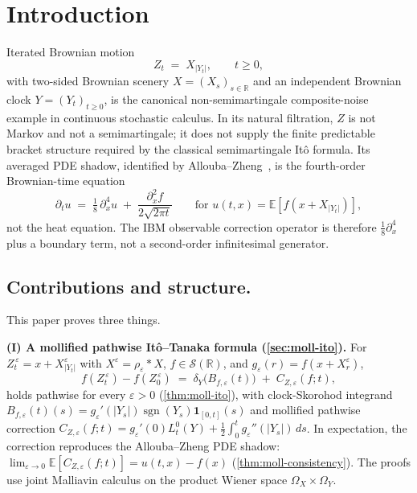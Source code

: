 \documentclass[EJP]{ejpecp}
\newcommand{\R}{\mathbb{R}}
\renewcommand{\E}{\mathbb{E}}
\newcommand{\IBM}{Z}
\DeclareMathOperator{\sgn}{sgn}
\begin{document}
\section{Introduction}\label{sec:intro}

Iterated Brownian motion
\begin{equation}\label{eq:ibm-def}
  \IBM_t\;=\;X_{|Y_t|},\qquad t\ge 0,
\end{equation}
with two-sided Brownian scenery $X=(X_s)_{s\in\R}$ and an independent
Brownian clock $Y=(Y_t)_{t\ge 0}$, is the canonical non-semimartingale
composite-noise example in continuous stochastic calculus. In its
natural filtration, $\IBM$ is not Markov and not a semimartingale;
it does not supply the finite predictable bracket structure required
by the classical semimartingale It\^o formula. Its averaged PDE
shadow, identified by Allouba--Zheng~\cite{AllouZheng}, is the
fourth-order Brownian-time equation
\begin{equation}\label{eq:az-intro}
  \partial_t u\;=\;\tfrac18\,\partial_x^{4}u
   \;+\;\frac{\partial_x^{2}f}{2\sqrt{2\pi t}}
  \qquad\text{for }u(t,x)=\E[f(x+X_{|Y_t|})],
\end{equation}
not the heat equation. The IBM observable correction operator is
therefore $\tfrac18\partial_x^{4}$ plus a boundary term, not a
second-order infinitesimal generator.

\subsection*{Contributions and structure.}
This paper proves three things.

\smallskip
\noindent\textbf{(I) A mollified pathwise It\^o--Tanaka formula
(\cref{sec:moll-ito}).}
For $\IBM_t^{\,\varepsilon}=x+X^{\varepsilon}_{|Y_t|}$ with
$X^{\varepsilon}=\rho_{\varepsilon}*X$, $f\in\mathscr S(\R)$, and
$g_{\varepsilon}(r)=f(x+X^{\varepsilon}_{r})$,
\begin{equation}\label{eq:flagship-intro}
  f(\IBM_t^{\,\varepsilon})-f(\IBM_0^{\,\varepsilon})
   \;=\;\delta_Y\bigl(B_{f,\varepsilon}(t)\bigr)
   \;+\;C_{\IBM,\varepsilon}(f;t),
\end{equation}
holds pathwise for every $\varepsilon>0$ (\cref{thm:moll-ito}), with
clock-Skorohod integrand
$B_{f,\varepsilon}(t)(s)=g_\varepsilon'(|Y_s|)\sgn(Y_s)\mathbf 1_{[0,t]}(s)$
and mollified pathwise correction
$C_{\IBM,\varepsilon}(f;t)=g_\varepsilon'(0)L_t^{0}(Y)
+\tfrac12\!\int_0^{t}g_\varepsilon''(|Y_s|)\,ds$.
In expectation, the correction reproduces the Allouba--Zheng PDE
shadow: $\lim_{\varepsilon\to 0}\E[C_{\IBM,\varepsilon}(f;t)]
=u(t,x)-f(x)$ (\cref{thm:moll-consistency}). The proofs use joint
Malliavin calculus on the product Wiener space
$\Omega_X\times\Omega_Y$.
\end{document}
